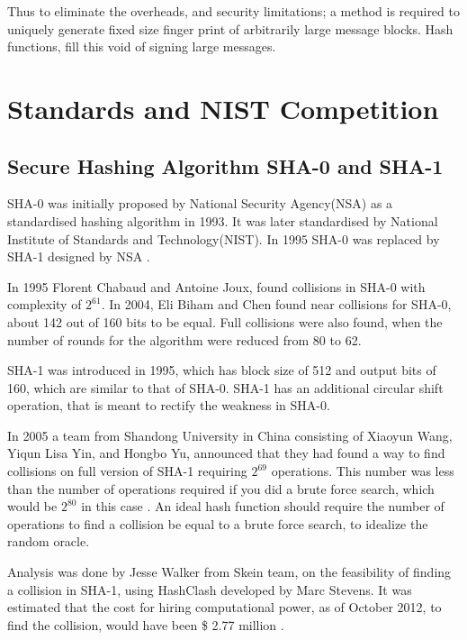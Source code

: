 Thus to eliminate the overheads, and security limitations; a method is required to uniquely generate fixed
size finger print of arbitrarily large message blocks. Hash functions, fill this void of signing large messages.

\section{Standards and NIST Competition} 

  \subsection{Secure Hashing Algorithm SHA-0 and SHA-1}

  SHA-0 was initially proposed by National Security Agency(NSA) as a standardised hashing algorithm
  in 1993. It was later standardised by National Institute of Standards and Technology(NIST). In 
  1995 SHA-0 was replaced by SHA-1 designed by NSA \cite{00006, 00007}.

  In 1995 Florent Chabaud and Antoine Joux, found collisions in SHA-0 with complexity of $2^{61}$. In
  2004, Eli Biham and Chen found near collisions for SHA-0, about 142 out of 160 bits to be equal. Full
  collisions were also found, when the number of rounds for the algorithm were reduced from 80 to 62.

  SHA-1 was introduced in 1995, which has block size of 512 and output bits of 160, which are similar
  to that of SHA-0. SHA-1 has an additional circular shift operation, that is meant to rectify the 
  weakness in SHA-0.

  In 2005 a team from Shandong University in China consisting of Xiaoyun Wang, Yiqun Lisa Yin, 
  and Hongbo Yu, announced that they had found a way to find collisions on full version of SHA-1 
  requiring $2^{69}$ operations. This number was less than the number of operations required if you
  did a brute force search, which would be $2^{80}$ in this case \cite{00010}. An ideal hash function 
  should require the number of operations to find a collision be equal to a brute force search, to 
  idealize the random oracle. 

  Analysis was done by Jesse Walker from Skein team, on the feasibility of finding a collision in 
  SHA-1, using HashClash developed by Marc Stevens. It was estimated that the cost for hiring 
  computational power, as of October 2012, to find the collision, would have been \$ 2.77 million
  \cite{00008}.

